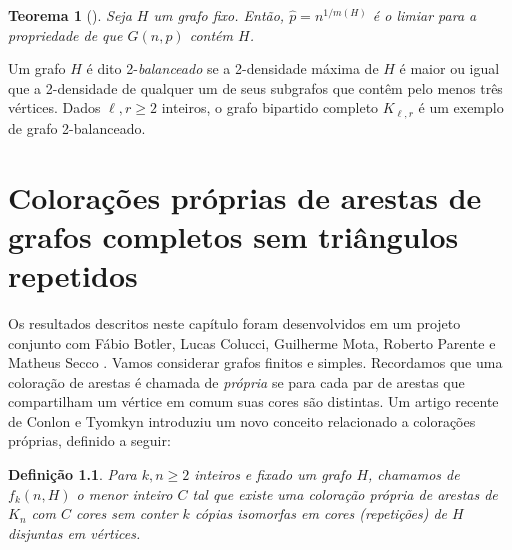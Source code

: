 \documentclass[12pt,a4paper]{book}
\newcommand{\K}{K_{\ell,r}} %
\newtheorem{teorema}{Teorema}[chapter]
\newtheorem{defi}  [teorema] {Definição}
\begin{document}

\begin{teorema}[\cite{bollobas1981threshold}]\label{teo:gnpcontem}
    Seja $H$ um grafo fixo. Então, $\hat{p} = n^{1/m(H)}$ é o limiar para a propriedade de que $G(n,p)$ contém $H$.
\end{teorema}

Um grafo $H$ é dito 2-\textit{balanceado} se a 2-densidade máxima de $H$ é maior ou igual que a 2-densidade de qualquer um de seus subgrafos que contêm pelo menos três vértices. 
Dados $\ell,r\geq 2$ inteiros, o grafo bipartido completo $\K$ é um exemplo de grafo 2-balanceado.





\chapter[Colorações de grafos completos sem $K_3$ repetidos]{Colorações próprias de arestas de grafos completos sem triângulos repetidos}
\label{cap:triangles} 


Os resultados descritos neste capítulo foram desenvolvidos em um projeto conjunto com Fábio Botler, Lucas Colucci, Guilherme Mota, Roberto Parente e Matheus Secco \cite{botler2022proper}.
Vamos considerar grafos finitos e simples. 
Recordamos que uma coloração de arestas é chamada de \emph{própria} se para cada par de arestas que compartilham um vértice em comum suas cores são distintas. Um artigo recente de Conlon e Tyomkyn  \cite{conlontyomkyn} introduziu um novo conceito relacionado a colorações próprias, definido a seguir: 

\begin{defi}\label{def:fkn}
            Para $k,n\geq 2$ inteiros e fixado um grafo $H$, chamamos de $f_k(n,H)$ o menor inteiro $C$ tal que existe uma coloração
            própria de arestas de $K_n$ com $C$ cores sem conter $k$ cópias isomorfas em cores (\emph{repetições}) de $H$ disjuntas em vértices. 
\end{defi}
\end{document}
